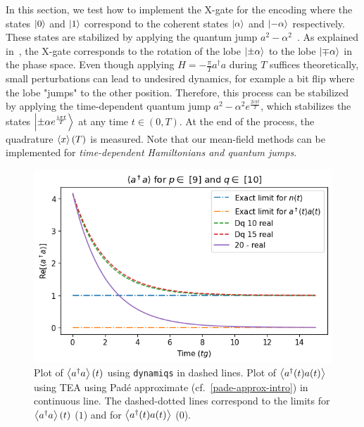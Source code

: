 In this section, we test how to implement the X-gate for the encoding where the states $\ket{0}$ and $\ket{1}$ correspond to the coherent states $\ket{\alpha}$ and $\ket{-\alpha}$ respectively. These states are stabilized by applying the quantum jump $a^2-\alpha^2$~\cite{jeremie-X-CX}. As explained in~\cite{jeremie-X-CX}, the X-gate corresponds to the rotation of the lobe $\ket{\pm \alpha}$ to the lobe $\ket{\mp \alpha}$ in the phase space. Even though applying $H = -\frac{\pi}{T} a^\dagger a$ during $T$ suffices theoretically, small perturbations can lead to undesired dynamics, for example a bit flip where the lobe "jumps" to the other position. Therefore, this process can be stabilized by applying the time-dependent quantum jump $a^2-\alpha^2 e^{\frac{2i\pi t}{T}}$, which stabilizes the states $\ket{\pm \alpha e^{\frac{i\pi t}{T}}}$ at any time $t \in (0, T)$. At the end of the process, the quadrature $\left\langle x \right\rangle(T)$ is measured. Note that our mean-field methods can be implemented for \textit{time-dependent Hamiltonians and quantum jumps}.

\begin{center}
    \begin{figure}[h!]
      \centering
      \includegraphics[width=0.9\linewidth]{Pics/comp_a_dag_a__vs_n.pdf}
      \caption{Plot of $\left\langle a^\dagger a \right\rangle(t)$ using \texttt{dynamiqs} \cite{dynamiqs} in dashed lines. Plot of $\left\langle a^\dagger(t) a(t) \right\rangle$ using TEA using Padé approximate (cf.\@~\autoref{pade-approx-intro}) in continuous line. The dashed-dotted lines correspond to the limits for $\left\langle a^\dagger a \right\rangle(t)$ ($1$) and for $\left\langle a^\dagger(t) a(t) \right\rangle$ ($0$).}
      \label{fig:comp_a_dag_a__vs_n}
    \end{figure}
\end{center}


